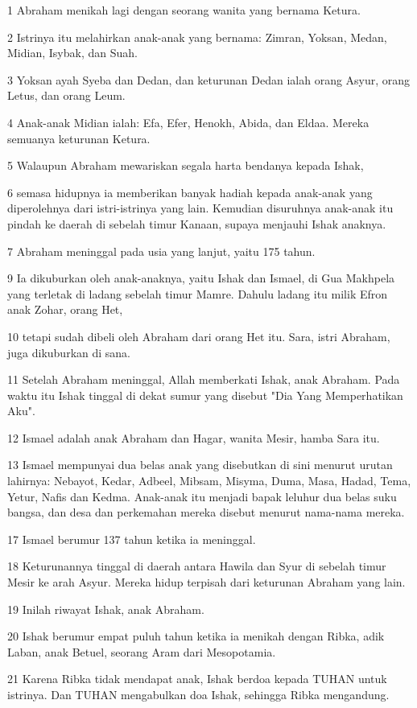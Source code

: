 \par 1 Abraham menikah lagi dengan seorang wanita yang bernama Ketura.
\par 2 Istrinya itu melahirkan anak-anak yang bernama: Zimran, Yoksan, Medan, Midian, Isybak, dan Suah.
\par 3 Yoksan ayah Syeba dan Dedan, dan keturunan Dedan ialah orang Asyur, orang Letus, dan orang Leum.
\par 4 Anak-anak Midian ialah: Efa, Efer, Henokh, Abida, dan Eldaa. Mereka semuanya keturunan Ketura.
\par 5 Walaupun Abraham mewariskan segala harta bendanya kepada Ishak,
\par 6 semasa hidupnya ia memberikan banyak hadiah kepada anak-anak yang diperolehnya dari istri-istrinya yang lain. Kemudian disuruhnya anak-anak itu pindah ke daerah di sebelah timur Kanaan, supaya menjauhi Ishak anaknya.
\par 7 Abraham meninggal pada usia yang lanjut, yaitu 175 tahun.
\par 9 Ia dikuburkan oleh anak-anaknya, yaitu Ishak dan Ismael, di Gua Makhpela yang terletak di ladang sebelah timur Mamre. Dahulu ladang itu milik Efron anak Zohar, orang Het,
\par 10 tetapi sudah dibeli oleh Abraham dari orang Het itu. Sara, istri Abraham, juga dikuburkan di sana.
\par 11 Setelah Abraham meninggal, Allah memberkati Ishak, anak Abraham. Pada waktu itu Ishak tinggal di dekat sumur yang disebut "Dia Yang Memperhatikan Aku".
\par 12 Ismael adalah anak Abraham dan Hagar, wanita Mesir, hamba Sara itu.
\par 13 Ismael mempunyai dua belas anak yang disebutkan di sini menurut urutan lahirnya: Nebayot, Kedar, Adbeel, Mibsam, Misyma, Duma, Masa, Hadad, Tema, Yetur, Nafis dan Kedma. Anak-anak itu menjadi bapak leluhur dua belas suku bangsa, dan desa dan perkemahan mereka disebut menurut nama-nama mereka.
\par 17 Ismael berumur 137 tahun ketika ia meninggal.
\par 18 Keturunannya tinggal di daerah antara Hawila dan Syur di sebelah timur Mesir ke arah Asyur. Mereka hidup terpisah dari keturunan Abraham yang lain.
\par 19 Inilah riwayat Ishak, anak Abraham.
\par 20 Ishak berumur empat puluh tahun ketika ia menikah dengan Ribka, adik Laban, anak Betuel, seorang Aram dari Mesopotamia.
\par 21 Karena Ribka tidak mendapat anak, Ishak berdoa kepada TUHAN untuk istrinya. Dan TUHAN mengabulkan doa Ishak, sehingga Ribka mengandung.
